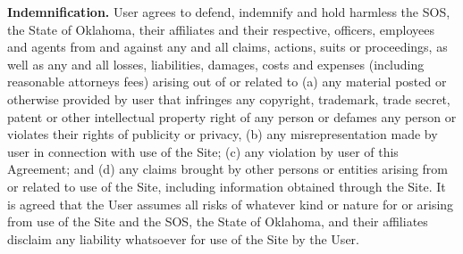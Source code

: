 \textbf{Indemnification.}
User agrees to defend, indemnify and hold harmless the SOS, the State of
Oklahoma, their affiliates and their respective, officers, employees and agents
from and against any and all claims, actions, suits or proceedings, as well as
any and all losses, liabilities, damages, costs and expenses (including
reasonable attorneys fees) arising out of or related to (a) any material posted
or otherwise provided by user that infringes any copyright, trademark, trade
secret, patent or other intellectual property right of any person or defames any
person or violates their rights of publicity or privacy, (b) any
misrepresentation made by user in connection with use of the Site; (c) any
violation by user of this Agreement; and (d) any claims brought by other persons
or entities arising from or related to use of the Site, including information
obtained through the Site. It is agreed that the User assumes all risks of
whatever kind or nature for or arising from use of the Site and the SOS, the
State of Oklahoma, and their affiliates disclaim any liability whatsoever for
use of the Site by the User.